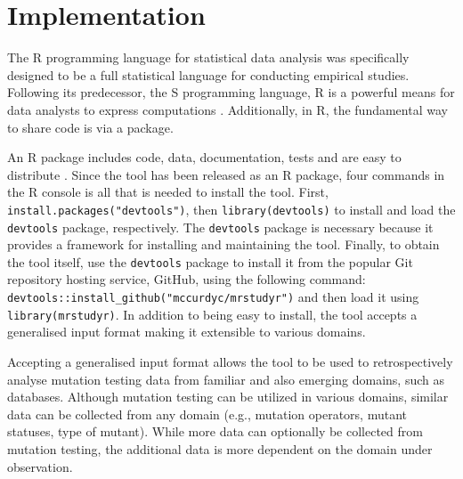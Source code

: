 \section{Implementation}

The R programming language for statistical data analysis was specifically designed to
be a full statistical language for conducting empirical studies. Following its predecessor, the S programming
language, R is a powerful means for data analysts to express computations \cite{ihaka1996r}.
Additionally, in R, the fundamental way to share code is via a package.

An R package includes code, data, documentation, tests and are easy to distribute \cite{wickham2015r}.
Since the \mr tool has been released as an R package, four commands in the R console
is all that is needed to install the tool.
First, \texttt{install.packages("devtools")}, then \texttt{library(devtools)}
to install and load the \texttt{devtools}\cite{devtools} package, respectively.
The \texttt{devtools} package is necessary because it provides a framework for installing
and maintaining the tool. Finally, to obtain the
\mr\cite{mrstudyr} tool itself, use the \texttt{devtools} package to install it
from the popular Git repository hosting service, GitHub\cite{github},
using the following command: {\small\texttt{devtools::install\_github("mccurdyc/mrstudyr")}}
and then load it using \texttt{library(mrstudyr)}.
In addition to being easy to install, the \mr tool accepts a generalised input format making
it extensible to various domains.

Accepting a generalised input format allows the \mr tool to be used to retrospectively analyse mutation testing
data from familiar and also emerging domains, such as databases. Although mutation
testing can be utilized in various domains, similar data can be collected from any
domain (e.g., mutation operators, mutant statuses, type of mutant). While more data
can optionally be collected from mutation testing, the additional data is more
dependent on the domain under observation.




